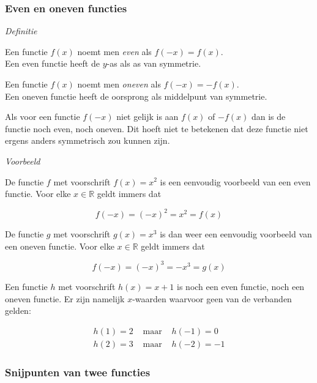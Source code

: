 \subsubsection{Even en oneven functies}

\emph{Definitie}

\noindent Een functie $f(x)$ noemt men \emph{even} als $f(-x)=f(x)$.
\\
Een even functie heeft de $y$-as als as van symmetrie.

\noindent \medskip{}


\noindent Een functie $f(x)$ noemt men \emph{oneven} als $f(-x)=-f(x)$.
\\
Een oneven functie heeft de oorsprong als middelpunt van symmetrie.

\noindent \medskip{}


\noindent Als voor een functie $f(-x)$ niet gelijk is aan $f(x)$
of $-f(x)$ dan is de functie noch even, noch oneven. Dit hoeft niet
te betekenen dat deze functie niet ergens anders symmetrisch zou kunnen
zijn.


\emph{Voorbeeld}

De functie $f$ met voorschrift $f(x)=x^2$ is een eenvoudig voorbeeld van een even functie. Voor elke  $x \in \mathbb{R}$ geldt immers dat 

\begin{equation*}
f(-x)=(-x)^2=x^2=f(x)
\end{equation*}

De functie $g$ met voorschrift $g(x)=x^3$ is dan weer een eenvoudig voorbeeld van een oneven functie. Voor elke $x \in \mathbb{R}$ geldt immers dat

\begin{equation*}
f(-x)=(-x)^3=-x^3=g(x)
\end{equation*}

Een functie $h$ met voorschrift $h(x)=x+1$ is noch een even functie, noch een oneven functie. Er zijn namelijk $x$-waarden waarvoor geen van de verbanden gelden:

\begin{eqnarray*}
h(1) = 2 &\text{ maar }& h(-1) = 0 \\
h(2) = 3 &\text{ maar }& h(-2) = -1 
\end{eqnarray*}


\subsubsection{Snijpunten van twee functies}

